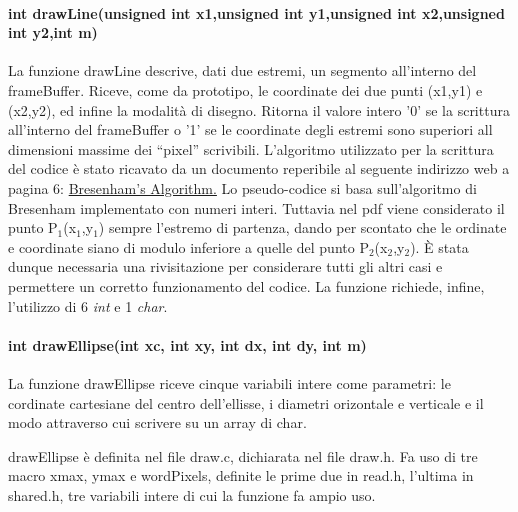 \documentclass{article}
\begin{document}
		\paragraph{int drawLine(unsigned int x1,unsigned int y1,unsigned int x2,unsigned int y2,int m)}
                La funzione drawLine descrive, dati due estremi, un segmento all'interno del frameBuffer.
                \newline
                Riceve, come da prototipo, le coordinate dei due punti (x1,y1) e (x2,y2), ed infine la modalità di disegno.
                Ritorna il valore intero '0' se la scrittura all'interno del frameBuffer o '1' se le coordinate degli estremi sono superiori all dimensioni massime dei ``pixel'' scrivibili.
                L'algoritmo utilizzato per la scrittura del codice è stato ricavato da un documento reperibile al seguente indirizzo web a pagina 6:
                \href{http://www.idav.ucdavis.edu/education/GraphicsNotes/Bresenhams-Algorithm.pdf}{Bresenham's Algorithm.}\newline
                Lo pseudo-codice si basa sull'algoritmo di Bresenham implementato con numeri interi.
                Tuttavia nel pdf viene considerato il punto P$_{1}$(x$_{1}$,y$_{1}$) sempre l'estremo di partenza, dando per scontato che le ordinate e coordinate siano di modulo inferiore a quelle del punto P$_{2}$(x$_{2}$,y$_{2}$).
                È stata dunque necessaria una rivisitazione per considerare tutti gli altri casi e permettere un corretto funzionamento del codice.
                La funzione richiede, infine, l'utilizzo di 6 \textit{int} e 1 \textit{char}.
		\paragraph{int drawEllipse(int xc, int xy, int dx, int dy, int m)}
		La funzione drawEllipse riceve cinque variabili intere come parametri:
                le cordinate cartesiane del centro dell'ellisse, i diametri orizontale e verticale e il modo attraverso cui scrivere su un array di char.
		
		drawEllipse è definita nel file draw.c, dichiarata nel file draw.h.
                Fa uso di tre macro xmax, ymax e wordPixels, definite le prime due in read.h, l'ultima in shared.h, tre variabili intere di cui la funzione fa ampio uso.
		
\end{document}
